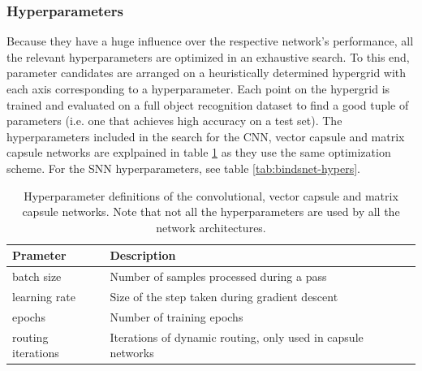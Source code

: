 \subsubsection{Hyperparameters}
Because they have a huge influence over the respective network's performance, all the relevant hyperparameters are optimized in an exhaustive search. To this end, parameter candidates are arranged on a heuristically determined hypergrid with each axis corresponding to a hyperparameter. Each point on the hypergrid is trained and evaluated on a full object recognition dataset to find a good tuple of parameters (i.e. one that achieves high accuracy on a test set). The hyperparameters included in the search for the CNN, vector capsule and matrix capsule networks are explpained in table \ref{tab:pytorch-hypers} as they use the same optimization scheme. For the SNN hyperparameters, see table \ref{tab:bindsnet-hypers}.
\begin{table}[H]
\centering
\begin{tabular}{@{}ll@{}}
\toprule
Prameter           & Description                                                  \\ \midrule
batch size         & Number of samples processed during a pass                     \\
learning rate      & Size of the step taken during gradient descent               \\
epochs             & Number of training epochs                                    \\
routing iterations & Iterations of dynamic routing, only used in capsule networks \\ \bottomrule
\end{tabular}
\caption[Hyperparameter definitions of the convolutional, vector capsule and matrix capsule networks]{Hyperparameter definitions of the convolutional, vector capsule and matrix capsule networks. Note that not all the hyperparameters are used by all the network architectures.}
\label{tab:pytorch-hypers}
\end{table}

